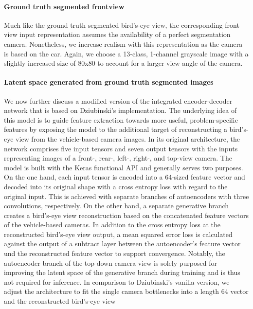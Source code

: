 \documentclass[letterpaper, 10 pt, conference]{ieeeconf}  %
\begin{document}
\paragraph{Ground truth segmented frontview}
Much like the ground truth segmented bird's-eye view, the corresponding front view input representation assumes the availability of a 
perfect segmentation camera. Nonetheless, we increase realism with this representation as the camera is based on the car.
Again, we choose a 13-class, 1-channel grayscale image with a slightly increased size of 80x80 to account for a larger view angle of the 
camera. 
\paragraph{Latent space generated from ground truth segmented images}
We now further discuss a modified version of the integrated encoder-decoder network that is based on 
Dziubinski's \cite{dziubinskiSemanticSegmentationSemantic2019} implementation. 
The underlying idea of this model is to 
guide feature extraction towards more useful, problem-specific features by exposing the model to the additional 
target of reconstructing a bird's-eye view from the vehicle-based camera images.
In its original architecture, the network comprises 
five input tensors and seven output tensors with the inputs representing images of a front-, rear-, left-, right-, and top-view camera. The 
model is built with the Keras functional API and generally serves two purposes. On the one hand, each input tensor is encoded into 
a 64-sized feature vector and decoded into its original shape with a cross entropy loss with regard to the original input. This is 
achieved with separate branches of autoencoders with three convolutions, respectively. On the other 
hand, a separate generative branch creates a bird's-eye view reconstruction based on the concatenated feature vectors of the 
vehicle-based cameras. In addition to the cross entropy loss at the reconstructed bird's-eye view output, a mean squared error 
loss is calculated against the output of a subtract layer between the autoencoder's feature vector und the reconstructed feature vector to support
convergence. Notably, the autoencoder branch of the top-down camera view is solely purposed for improving the latent space of the generative branch 
during training and is thus not required for inference. 
\newline In comparison to Dziubinski's \cite{dziubinskiSemanticSegmentationSemantic2019} vanilla version, we 
adjust the architecture to fit the single camera bottlenecks into a length 64 vector and the reconstructed bird's-eye view
\end{document}
